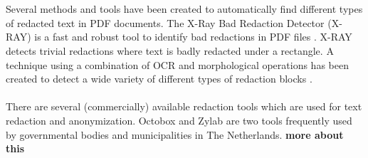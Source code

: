 \\\\
Several methods and tools have been created to automatically find different types of redacted text in PDF documents. The X-Ray Bad Redaction Detector (X-RAY) is a fast and robust tool to identify bad redactions in PDF files \cite{Xray2021}. X-RAY detects trivial redactions where text is badly redacted under a rectangle. A technique using a combination of OCR and morphological operations has been created to detect a wide variety of different types of redaction blocks \cite{van2023detection}.
\\\\
There are several (commercially) available redaction tools which are used for text redaction and anonymization. Octobox \cite{OCTOBOX} and Zylab \cite{Zylab} are two tools frequently used by governmental bodies and municipalities in The Netherlands. \textbf{more about this}
